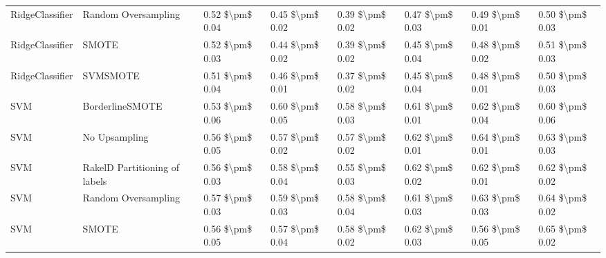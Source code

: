 \begin{tabular}{llllllll}
                RidgeClassifier &           Random Oversampling & 0.52 \$\textbackslash pm\$ 0.04 &           0.45 \$\textbackslash pm\$ 0.02 &       0.39 \$\textbackslash pm\$ 0.02 &        0.47 \$\textbackslash pm\$ 0.03 &                         0.49 \$\textbackslash pm\$ 0.01 & 0.50 \$\textbackslash pm\$ 0.03 \\
                RidgeClassifier &                         SMOTE & 0.52 \$\textbackslash pm\$ 0.03 &           0.44 \$\textbackslash pm\$ 0.02 &       0.39 \$\textbackslash pm\$ 0.02 &        0.45 \$\textbackslash pm\$ 0.04 &                         0.48 \$\textbackslash pm\$ 0.02 & 0.51 \$\textbackslash pm\$ 0.03 \\
                RidgeClassifier &                      SVMSMOTE & 0.51 \$\textbackslash pm\$ 0.04 &           0.46 \$\textbackslash pm\$ 0.01 &       0.37 \$\textbackslash pm\$ 0.02 &        0.45 \$\textbackslash pm\$ 0.04 &                         0.48 \$\textbackslash pm\$ 0.01 & 0.50 \$\textbackslash pm\$ 0.03 \\
                            SVM &               BorderlineSMOTE & 0.53 \$\textbackslash pm\$ 0.06 &           0.60 \$\textbackslash pm\$ 0.05 &       0.58 \$\textbackslash pm\$ 0.03 &        0.61 \$\textbackslash pm\$ 0.01 &                         0.62 \$\textbackslash pm\$ 0.04 & 0.60 \$\textbackslash pm\$ 0.06 \\
                            SVM &                 No Upsampling & 0.56 \$\textbackslash pm\$ 0.05 &           0.57 \$\textbackslash pm\$ 0.02 &       0.57 \$\textbackslash pm\$ 0.02 &        0.62 \$\textbackslash pm\$ 0.01 &                         0.64 \$\textbackslash pm\$ 0.01 & 0.63 \$\textbackslash pm\$ 0.03 \\
                            SVM & RakelD Partitioning of labels & 0.56 \$\textbackslash pm\$ 0.03 &           0.58 \$\textbackslash pm\$ 0.04 &       0.55 \$\textbackslash pm\$ 0.03 &        0.62 \$\textbackslash pm\$ 0.02 &                         0.62 \$\textbackslash pm\$ 0.01 & 0.62 \$\textbackslash pm\$ 0.02 \\
                            SVM &           Random Oversampling & 0.57 \$\textbackslash pm\$ 0.03 &           0.59 \$\textbackslash pm\$ 0.03 &       0.58 \$\textbackslash pm\$ 0.04 &        0.61 \$\textbackslash pm\$ 0.03 &                         0.63 \$\textbackslash pm\$ 0.03 & 0.64 \$\textbackslash pm\$ 0.02 \\
                            SVM &                         SMOTE & 0.56 \$\textbackslash pm\$ 0.05 &           0.57 \$\textbackslash pm\$ 0.04 &       0.58 \$\textbackslash pm\$ 0.02 &        0.62 \$\textbackslash pm\$ 0.03 &                         0.56 \$\textbackslash pm\$ 0.05 & 0.65 \$\textbackslash pm\$ 0.02 \\

\end{tabular}
